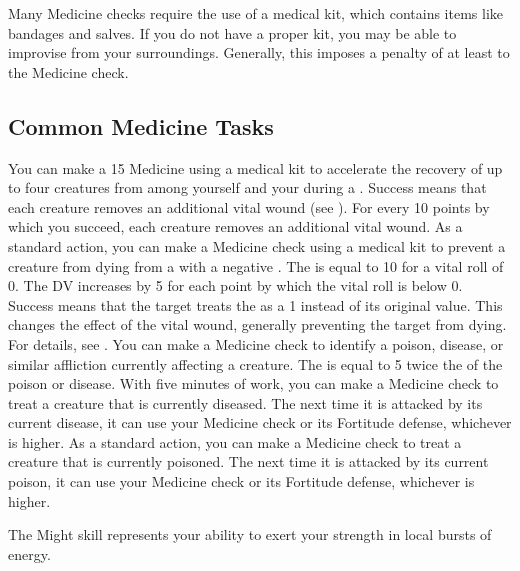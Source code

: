   Many Medicine checks require the use of a medical kit, which contains items like bandages and salves.
  If you do not have a proper kit, you may be able to improvise from your surroundings.
  Generally, this imposes a penalty of at least  to the Medicine check.

  \subsection{Common Medicine Tasks}
    You can make a  15 Medicine  using a medical kit to accelerate the recovery of up to four creatures from among yourself and your  during a .
    Success means that each creature removes an additional vital wound (see ).
    For every 10 points by which you succeed, each creature removes an additional vital wound.
    As a standard action, you can make a Medicine check using a medical kit to prevent a creature from dying from a  with a negative .
    The  is equal to 10 for a vital roll of 0.
    The DV increases by 5 for each point by which the vital roll is below 0.
    Success means that the target treats the  as a 1 instead of its original value.
    This changes the effect of the vital wound, generally preventing the target from dying.
    For details, see .
    You can make a Medicine check to identify a poison, disease, or similar affliction currently affecting a creature.
    The  is equal to 5 \add twice the  of the poison or disease.
     With five minutes of work, you can make a Medicine check to treat a creature that is currently diseased.
    The next time it is attacked by its current disease, it can use your Medicine check or its Fortitude defense, whichever is higher.
     As a standard action, you can make a Medicine check to treat a creature that is currently poisoned.
    The next time it is attacked by its current poison, it can use your Medicine check or its Fortitude defense, whichever is higher.

\newpage
{}
  The Might skill represents your ability to exert your strength in local bursts of energy.

